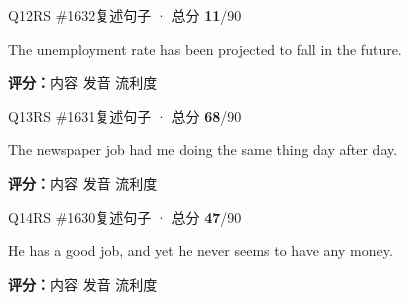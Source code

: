 \begin{qblock}{Q12\quad RS \#1632}{复述句子 · 总分 \textcolor{cAccent}{\bfseries 11}/90}
\begin{promptbox}
The unemployment rate has been projected to fall in the future.
\end{promptbox}
\asrlegend
\begin{asrbox}
          
\end{asrbox}
\smallskip
{\small\textbf{评分：}内容  \quad\textperiodcentered\quad 发音  \quad\textperiodcentered\quad 流利度 }
\end{qblock}

\begin{qblock}{Q13\quad RS \#1631}{复述句子 · 总分 \textcolor{cAccent}{\bfseries 68}/90}
\begin{promptbox}
The newspaper job had me doing the same thing day after day.
\end{promptbox}
\asrlegend
\begin{asrbox}
           
\end{asrbox}
\smallskip
{\small\textbf{评分：}内容  \quad\textperiodcentered\quad 发音  \quad\textperiodcentered\quad 流利度 }
\end{qblock}

\begin{qblock}{Q14\quad RS \#1630}{复述句子 · 总分 \textcolor{cAccent}{\bfseries 47}/90}
\begin{promptbox}
He has a good job, and yet he never seems to have any money.
\end{promptbox}
\asrlegend
\begin{asrbox}
             
\end{asrbox}
\smallskip
{\small\textbf{评分：}内容  \quad\textperiodcentered\quad 发音  \quad\textperiodcentered\quad 流利度 }
\end{qblock}

